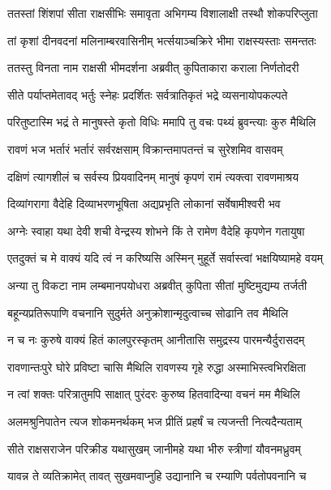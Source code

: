 \twolineshloka
{ततस्तां शिंशपां सीता राक्षसीभिः समावृता}
{अभिगम्य विशालाक्षी तस्थौ शोकपरिप्लुता} %

\twolineshloka
{तां कृशां दीनवदनां मलिनाम्बरवासिनीम्}
{भर्त्सयाञ्चक्रिरे भीमा राक्षस्यस्ताः समन्ततः} %

\twolineshloka
{ततस्तु विनता नाम राक्षसी भीमदर्शना}
{अब्रवीत् कुपिताकारा कराला निर्णतोदरी} %

\twolineshloka
{सीते पर्याप्तमेतावद् भर्तुः स्नेहः प्रदर्शितः}
{सर्वत्रातिकृतं भद्रे व्यसनायोपकल्पते} %

\twolineshloka
{परितुष्टास्मि भद्रं ते मानुषस्ते कृतो विधिः}
{ममापि तु वचः पथ्यं ब्रुवन्त्याः कुरु मैथिलि} %

\twolineshloka
{रावणं भज भर्तारं भर्तारं सर्वरक्षसाम्}
{विक्रान्तमापतन्तं च सुरेशमिव वासवम्} %

\twolineshloka
{दक्षिणं त्यागशीलं च सर्वस्य प्रियवादिनम्}
{मानुषं कृपणं रामं त्यक्त्वा रावणमाश्रय} %

\twolineshloka
{दिव्यांगरागा वैदेहि दिव्याभरणभूषिता}
{अद्यप्रभृति लोकानां सर्वेषामीश्वरी भव} %

\twolineshloka
{अग्नेः स्वाहा यथा देवी शची वेन्द्रस्य शोभने}
{किं ते रामेण वैदेहि कृपणेन गतायुषा} %

\twolineshloka
{एतदुक्तं च मे वाक्यं यदि त्वं न करिष्यसि}
{अस्मिन् मुहूर्ते सर्वास्त्वां भक्षयिष्यामहे वयम्} %

\twolineshloka
{अन्या तु विकटा नाम लम्बमानपयोधरा}
{अब्रवीत् कुपिता सीतां मुष्टिमुद्यम्य तर्जती} %

\twolineshloka
{बहून्यप्रतिरूपाणि वचनानि सुदुर्मते}
{अनुक्रोशान्मृदुत्वाच्च सोढानि तव मैथिलि} %

\twolineshloka
{न च नः कुरुषे वाक्यं हितं कालपुरस्कृतम्}
{आनीतासि समुद्रस्य पारमन्यैर्दुरासदम्} %

\twolineshloka
{रावणान्तःपुरे घोरे प्रविष्टा चासि मैथिलि}
{रावणस्य गृहे रुद्धा अस्माभिस्त्वभिरक्षिता} %

\twolineshloka
{न त्वां शक्तः परित्रातुमपि साक्षात् पुरंदरः}
{कुरुष्व हितवादिन्या वचनं मम मैथिलि} %

\twolineshloka
{अलमश्रुनिपातेन त्यज शोकमनर्थकम्}
{भज प्रीतिं प्रहर्षं च त्यजन्ती नित्यदैन्यताम्} %

\twolineshloka
{सीते राक्षसराजेन परिक्रीड यथासुखम्}
{जानीमहे यथा भीरु स्त्रीणां यौवनमध्रुवम्} %

\twolineshloka
{यावन्न ते व्यतिक्रामेत् तावत् सुखमवाप्नुहि}
{उद्यानानि च रम्याणि पर्वतोपवनानि च} %

